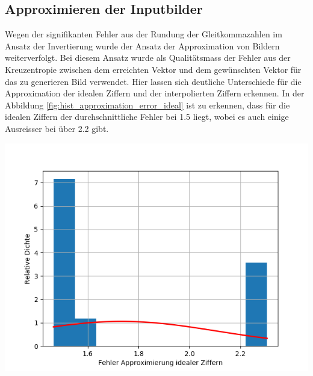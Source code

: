 \documentclass[Interploate_hadwritten_Digits.tex]{subfiles}
\begin{document}
	\subsection{Approximieren der Inputbilder}
	\label{sec:results_appriximation}
	Wegen der signifikanten Fehler aus der Rundung der Gleitkommazahlen im Ansatz der Invertierung wurde der Ansatz der Approximation von Bildern weiterverfolgt. Bei diesem Ansatz wurde als Qualitätsmass der Fehler aus der Kreuzentropie zwischen dem erreichten Vektor und dem gewünschten Vektor für das zu generieren Bild verwendet. Hier lassen sich deutliche Unterschiede für die Approximation der idealen Ziffern und der interpolierten Ziffern erkennen. In der Abbildung \ref{fig:hist_approximation_error_ideal} ist zu erkennen, dass für die idealen Ziffern der durchschnittliche Fehler bei 1.5 liegt, wobei es auch einige Ausreisser bei über 2.2 gibt.
	\begin{Figure}
		\centering
		\includegraphics[width=\linewidth]{img/results/histogram_approximation_error_ideal.png}
		\label{fig:hist_approximation_error_ideal}
	\end{Figure}	
	
\end{document}
